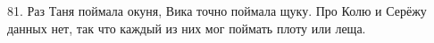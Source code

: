 81. Раз Таня поймала окуня, Вика точно поймала щуку. Про Колю и Серёжу данных нет, так что каждый из них мог поймать плоту или леща.\\
